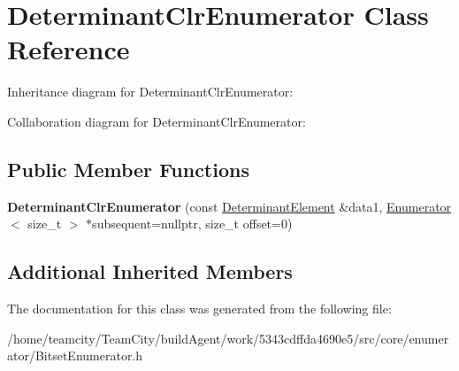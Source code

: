 \hypertarget{classDeterminantClrEnumerator}{}\section{Determinant\+Clr\+Enumerator Class Reference}
\label{classDeterminantClrEnumerator}


Inheritance diagram for Determinant\+Clr\+Enumerator\+:


Collaboration diagram for Determinant\+Clr\+Enumerator\+:
\subsection*{Public Member Functions}
\begin{DoxyCompactItemize}
\item 
{\bfseries Determinant\+Clr\+Enumerator} (const \hyperlink{classDeterminantElement}{Determinant\+Element} \&data1, \hyperlink{classEnumerator}{Enumerator}$<$ size\+\_\+t $>$ $\ast$subsequent=nullptr, size\+\_\+t offset=0)\hypertarget{classDeterminantClrEnumerator_ac62b7f64a2dd7e40b30545cf0d9344df}{}\label{classDeterminantClrEnumerator_ac62b7f64a2dd7e40b30545cf0d9344df}

\end{DoxyCompactItemize}
\subsection*{Additional Inherited Members}


The documentation for this class was generated from the following file\+:\begin{DoxyCompactItemize}
\item 
/home/teamcity/\+Team\+City/build\+Agent/work/5343cdffda4690e5/src/core/enumerator/Bitset\+Enumerator.\+h\end{DoxyCompactItemize}
